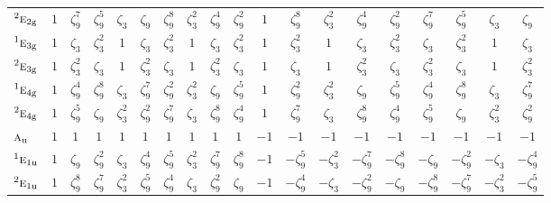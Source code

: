 \documentclass[10pt,a4paper]{article}
\numberwithin{equation}{section}
\newcommand{\irr}[1]{\text{\normalfont\scshape #1}}
\newcommand{\conjpair}[1]{{}^{#1}}
\newcommand{\ptag}[1]{\mathrm{#1}}
\newcommand{\rootunity}[1]{\zeta_{#1}}
\begin{document}
{\begin{longtable}{@{}lcccccccccccccccccc@{}}
$\conjpair{2}\irr{e}_{2\ptag{g}}$ & $1$ & $\rootunity{9}^{7}$ & $\rootunity{9}^{5}$ & $\rootunity{3}$ & $\rootunity{9}$ & $\rootunity{9}^{8}$ & $\rootunity{3}^{2}$ & $\rootunity{9}^{4}$ & $\rootunity{9}^{2}$ & $1$ & $\rootunity{9}^{8}$ & $\rootunity{3}^{2}$ & $\rootunity{9}^{4}$ & $\rootunity{9}^{2}$ & $\rootunity{9}^{7}$ & $\rootunity{9}^{5}$ & $\rootunity{3}$ & $\rootunity{9}$\\
$\conjpair{1}\irr{e}_{3\ptag{g}}$ & $1$ & $\rootunity{3}$ & $\rootunity{3}^{2}$ & $1$ & $\rootunity{3}$ & $\rootunity{3}^{2}$ & $1$ & $\rootunity{3}$ & $\rootunity{3}^{2}$ & $1$ & $\rootunity{3}^{2}$ & $1$ & $\rootunity{3}$ & $\rootunity{3}^{2}$ & $\rootunity{3}$ & $\rootunity{3}^{2}$ & $1$ & $\rootunity{3}$\\
$\conjpair{2}\irr{e}_{3\ptag{g}}$ & $1$ & $\rootunity{3}^{2}$ & $\rootunity{3}$ & $1$ & $\rootunity{3}^{2}$ & $\rootunity{3}$ & $1$ & $\rootunity{3}^{2}$ & $\rootunity{3}$ & $1$ & $\rootunity{3}$ & $1$ & $\rootunity{3}^{2}$ & $\rootunity{3}$ & $\rootunity{3}^{2}$ & $\rootunity{3}$ & $1$ & $\rootunity{3}^{2}$\\
$\conjpair{1}\irr{e}_{4\ptag{g}}$ & $1$ & $\rootunity{9}^{4}$ & $\rootunity{9}^{8}$ & $\rootunity{3}$ & $\rootunity{9}^{7}$ & $\rootunity{9}^{2}$ & $\rootunity{3}^{2}$ & $\rootunity{9}$ & $\rootunity{9}^{5}$ & $1$ & $\rootunity{9}^{2}$ & $\rootunity{3}^{2}$ & $\rootunity{9}$ & $\rootunity{9}^{5}$ & $\rootunity{9}^{4}$ & $\rootunity{9}^{8}$ & $\rootunity{3}$ & $\rootunity{9}^{7}$\\
$\conjpair{2}\irr{e}_{4\ptag{g}}$ & $1$ & $\rootunity{9}^{5}$ & $\rootunity{9}$ & $\rootunity{3}^{2}$ & $\rootunity{9}^{2}$ & $\rootunity{9}^{7}$ & $\rootunity{3}$ & $\rootunity{9}^{8}$ & $\rootunity{9}^{4}$ & $1$ & $\rootunity{9}^{7}$ & $\rootunity{3}$ & $\rootunity{9}^{8}$ & $\rootunity{9}^{4}$ & $\rootunity{9}^{5}$ & $\rootunity{9}$ & $\rootunity{3}^{2}$ & $\rootunity{9}^{2}$\\
$\irr{a}_{\ptag{u}}$ & $1$ & $1$ & $1$ & $1$ & $1$ & $1$ & $1$ & $1$ & $1$ & $-1$ & $-1$ & $-1$ & $-1$ & $-1$ & $-1$ & $-1$ & $-1$ & $-1$\\
$\conjpair{1}\irr{e}_{1\ptag{u}}$ & $1$ & $\rootunity{9}$ & $\rootunity{9}^{2}$ & $\rootunity{3}$ & $\rootunity{9}^{4}$ & $\rootunity{9}^{5}$ & $\rootunity{3}^{2}$ & $\rootunity{9}^{7}$ & $\rootunity{9}^{8}$ & $-1$ & $-\rootunity{9}^{5}$ & $-\rootunity{3}^{2}$ & $-\rootunity{9}^{7}$ & $-\rootunity{9}^{8}$ & $-\rootunity{9}$ & $-\rootunity{9}^{2}$ & $-\rootunity{3}$ & $-\rootunity{9}^{4}$\\
$\conjpair{2}\irr{e}_{1\ptag{u}}$ & $1$ & $\rootunity{9}^{8}$ & $\rootunity{9}^{7}$ & $\rootunity{3}^{2}$ & $\rootunity{9}^{5}$ & $\rootunity{9}^{4}$ & $\rootunity{3}$ & $\rootunity{9}^{2}$ & $\rootunity{9}$ & $-1$ & $-\rootunity{9}^{4}$ & $-\rootunity{3}$ & $-\rootunity{9}^{2}$ & $-\rootunity{9}$ & $-\rootunity{9}^{8}$ & $-\rootunity{9}^{7}$ & $-\rootunity{3}^{2}$ & $-\rootunity{9}^{5}$\\

\end{longtable}}
\end{document}
